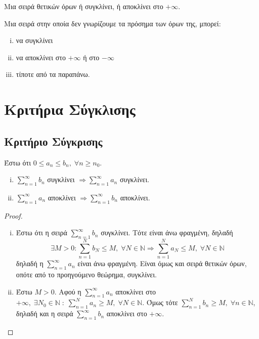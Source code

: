 \begin{cor}
    Μια σειρά θετικών όρων ή συγκλίνει, ή αποκλίνει στο $ + \infty $.  
\end{cor}

\begin{rem}
    Μια σειρά στην οποία δεν γνωρίζουμε τα πρόσημα των όρων της, μπορεί:
    \begin{enumerate}[i)]
        \item να συγκλίνει
        \item να αποκλίνει στο $ + \infty $ ή στο $ - \infty $
        \item τίποτε από τα παραπάνω.
    \end{enumerate}
\end{rem}



\section{Κριτήρια Σύγκλισης}

\subsection{Κριτήριο Σύγκρισης}
Έστω ότι $ 0 \leq a_{n} \leq b_{n}, \; \forall n \geq n_{0} $.
\begin{enumerate}[i)]
    \item $ \sum_{n=1}^{\infty} b_{n} $ συγκλίνει $ \Rightarrow \sum_{n=1}^{\infty} 
        a_{n}$ συγκλίνει.
    \item $ \sum_{n=1}^{\infty} a_{n} $ αποκλίνει $ \Rightarrow \sum_{n=1}^{\infty} 
        b_{n} $ αποκλίνει.
\end{enumerate}
\begin{proof}
\item {}
    \begin{enumerate}[i)]
        \item Έστω ότι η σειρά $ \sum_{n=1}^{\infty} b_{n} $ συγκλίνει. Τότε είναι 
            άνω φραγμένη, δηλαδή 
            \[
                \exists M>0 : \sum_{n=1}^{N} b_{N} \leq M, \; \forall N \in \mathbb{N}
                \Rightarrow \sum_{n=1}^{N} a_{N} \leq M, \; \forall N \in \mathbb{N}
            \]
            δηλαδή η $ \sum_{n=1}^{\infty} a_{n} $ είναι άνω φραγμένη. Είναι όμως και 
            σειρά θετικών όρων, οπότε από το προηγούμενο θεώρημα, συγκλίνει.

        \item Έστω $ M >0 $. Αφού η $ \sum_{n=1}^{\infty} a_{n} $ αποκλίνει στο $ 
            + \infty, \; \exists N_{0} \in \mathbb{N} \; : \; \sum_{n=1}^{N} a_{n} 
            \geq M, \; \forall N \in \mathbb{N} $. 
            Όμως τότε $ \sum_{n=1}^{N} b_{n} \geq M, \; \forall n \in \mathbb{N} $, 
            δηλαδή και η σειρά $ \sum_{n=1}^{\infty} b_{n} $ αποκλίνει στο $ 
            + \infty$.
    \end{enumerate}
\end{proof}

